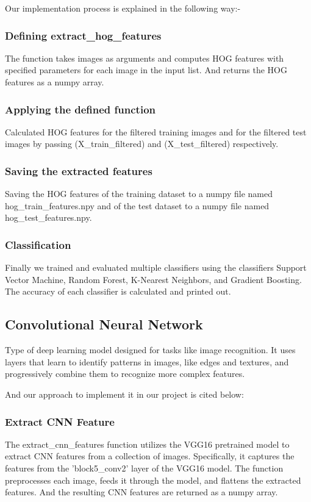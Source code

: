 \documentclass[a4paper]{article}
\theoremstyle{plain}
\theoremstyle{definition}
\begin{document}
Our implementation process is explained in the following way:-
        \subsubsection{Defining extract\_hog\_features}
The function takes images as arguments and computes HOG features with specified parameters for each image in the input list. And returns the HOG features as a numpy array.

        \subsubsection{Applying the defined function}
Calculated HOG features for the filtered training images and for the filtered test images by passing (X\_train\_filtered) and (X\_test\_filtered) respectively.

        \subsubsection{Saving the extracted features}
Saving the HOG features of the training dataset to a numpy file named hog\_train\_features.npy and of the test dataset to a numpy file named hog\_test\_features.npy.

        \subsubsection{Classification}
Finally we trained and evaluated multiple classifiers using the classifiers Support Vector Machine, Random Forest, K-Nearest Neighbors, and Gradient Boosting. The accuracy of each classifier is calculated and printed out.
        
        \subsection{Convolutional Neural Network}
	
\setlength {\parindent}{10pt} Type of deep learning model designed for tasks like image recognition. It uses layers that learn to identify patterns in images, like edges and textures, and progressively combine them to recognize more complex features.\bigskip

And our approach to implement it in our project is cited below:

        \subsubsection{Extract CNN Feature}
        The extract\_cnn\_features function utilizes the VGG16 pre\-trained model to extract CNN features from a collection of images. Specifically, it captures the features from the 'block5\_conv2' layer of the VGG16 model. The function preprocesses each image, feeds it through the model, and flattens the extracted features. And the resulting CNN features are returned as a numpy array.
\end{document}
